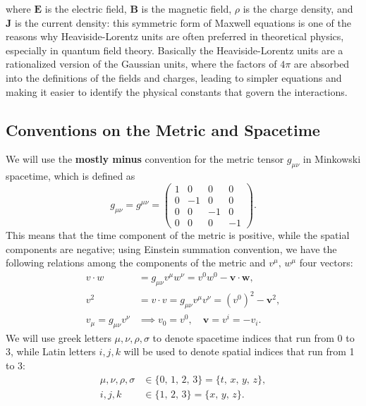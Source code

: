 \begin{itemize}
\[          \]
          where \(\mathbf{E}\) is the electric field, \(\mathbf{B}\) is the magnetic field, \(\rho\) is the charge density, and \(\mathbf{J}\) is the current density: this symmetric form of Maxwell equations is one of the reasons why Heaviside-Lorentz units are often preferred in theoretical physics, especially in quantum field theory. Basically the Heaviside-Lorentz units are a rationalized version of the Gaussian units, where the factors of \(4\pi\) are absorbed into the definitions of the fields and charges, leading to simpler equations and making it easier to identify the physical constants that govern the interactions.
\end{itemize}

\subsection*{Conventions on the Metric and Spacetime}

We will use the \textbf{mostly minus} convention for the metric tensor \(g_{\mu \nu}\) in Minkowski spacetime, which is defined as
\[
    g_{\mu \nu} = g^{\mu \nu} = \begin{pmatrix}
        1 & 0  & 0  & 0  \\
        0 & -1 & 0  & 0  \\
        0 & 0  & -1 & 0  \\
        0 & 0  & 0  & -1
    \end{pmatrix}.
\]
This means that the time component of the metric is positive, while the spatial components are negative; using Einstein summation convention, we have the following relations among the components of the metric and \(v^{\mu},\,w^{\mu}\) four vectors:
\[
    \begin{aligned}
        v \cdot w                   & = g_{\mu \nu} v^{\mu} w^{\nu} = v^0 w^0 - \mathbf{v} \cdot \mathbf{w}, \\
        v^2                         & = v \cdot v = g_{\mu \nu} v^{\mu} v^{\nu} = (v^0)^2 - \mathbf{v}^2,    \\
        v_\mu = g_{\mu \nu} v^{\nu} & \implies v_0 = v^0, \quad \mathbf{v} = v^i = -v_i.
    \end{aligned}
\]
We will use greek letters \(\mu, \nu, \rho, \sigma\) to denote spacetime indices that run from 0 to 3, while Latin letters \(i, j, k\) will be used to denote spatial indices that run from 1 to 3:
\[
    \begin{aligned}
        \mu, \nu, \rho, \sigma & \in \{ 0,\,1,\,2,\,3 \} = \{ t,\,x,\,y,\,z\}, \\
        i, j, k                & \in \{ 1,\,2,\,3 \} = \{ x,\,y,\,z\}.
    \end{aligned}
\]

